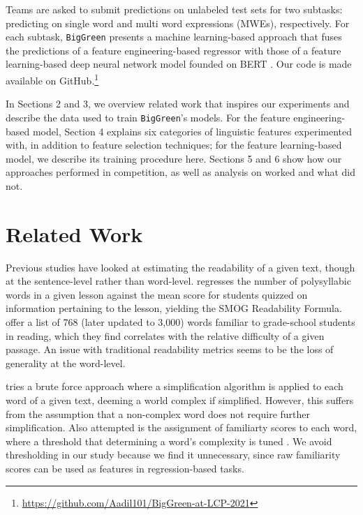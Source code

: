 \documentclass[11pt,a4paper]{article}
\begin{document}
Teams are asked to submit predictions on unlabeled test sets for two subtasks: predicting on single word and multi word expressions (MWEs), respectively. For each subtask, \texttt{BigGreen} presents a machine learning-based approach that fuses the predictions of a feature engineering-based regressor with those of a feature learning-based deep neural network model founded on BERT \citep{DBLP:journals/corr/abs-1810-04805}. Our code is made available on GitHub.\footnote{\url{https://github.com/Aadil101/BigGreen-at-LCP-2021}}

In Sections 2 and 3, we overview related work that inspires our experiments and describe the data used to train \texttt{BigGreen}'s models. For the feature engineering-based model, Section 4 explains six categories of linguistic features experimented with, in addition to feature selection techniques; for the feature learning-based model, we describe its training procedure here. Sections 5 and 6 show how our approaches performed in competition, as well as analysis on worked and what did not.

\section{Related Work}

Previous studies have looked at estimating the readability of a given text, though at the sentence-level rather than word-level. \citet{10.2307/40011226} regresses the number of polysyllabic words in a given lesson against the mean score for students quizzed on information pertaining to the lesson, yielding the SMOG Readability Formula. \citet{10.2307/1473169} offer a list of 768 (later updated to 3,000) words familiar to grade-school students in reading, which they find correlates with the relative difficulty of a given passage. An issue with traditional readability metrics seems to be the loss of generality at the word-level.

\citet{shardlow2013comparison} tries a brute force approach where a simplification algorithm is applied to each word of a given text, deeming a world complex if simplified. However, this suffers from the assumption that a non-complex word does not require further simplification. Also attempted is the assignment of familiarty scores to each word, where a threshold that determining a word's complexity is tuned \citep{shardlow2013comparison}. We avoid thresholding in our study because we find it unnecessary, since raw familiarity scores can be used as features in regression-based tasks. 
\end{document}
